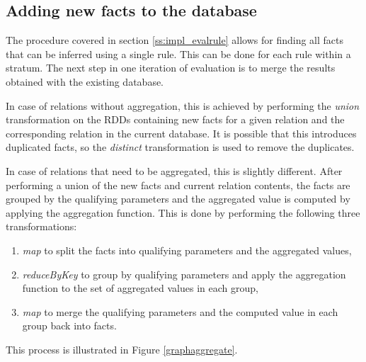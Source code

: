 \subsection{Adding new facts to the database}\label{ss:impl_merge}

The procedure covered in section \ref{ss:impl_evalrule} allows for finding all facts that can be inferred using a single rule. This can be done for each rule within a stratum. The next step in one iteration of evaluation is to merge the results obtained with the existing database.

In case of relations without aggregation, this is achieved by performing the \emph{union} transformation on the RDDs containing new facts for a given relation and the corresponding relation in the current database. It is possible that this introduces duplicated facts, so the \emph{distinct} transformation is used to remove the duplicates.

In case of relations that need to be aggregated, this is slightly different. After performing a union of the new facts and current relation contents, the facts are grouped by the qualifying parameters and the aggregated value is computed by applying the aggregation function. This is done by performing the following three transformations:
\begin{enumerate}
\item \emph{map} to split the facts into qualifying parameters and the aggregated values,
\item \emph{reduceByKey} to group by qualifying parameters and apply the aggregation function to the set of aggregated values in each group,
\item \emph{map} to merge the qualifying parameters and the computed value in each group back into facts.
\end{enumerate}
This process is illustrated in Figure \ref{graphaggregate}.


